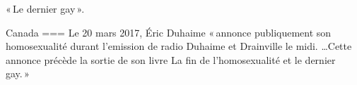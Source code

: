 « Le dernier gay ».

Canada
===
Le 20 mars 2017, Éric Duhaime « annonce publiquement son homosexualité durant l’emission de radio Duhaime et Drainville le midi. …Cette annonce précède la sortie de son livre La fin de l’homosexualité et le dernier gay. »

\nocite{2025b}